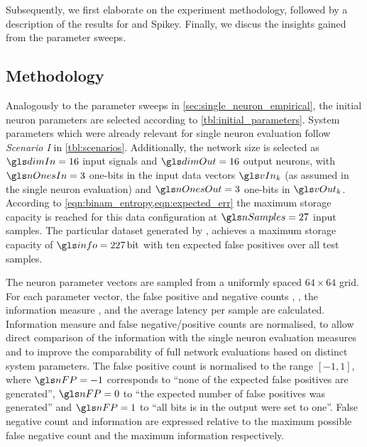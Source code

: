 Subsequently, we first elaborate on the experiment methodology, followed by a description of the results for \NMMC and Spikey. Finally, we discus the insights gained from the parameter sweeps.

\subsection{Methodology}
\label{sec:neuron_parameter_sweep_methodology}

Analogously to the parameter sweeps in \cref{sec:single_neuron_empirical}, the initial neuron parameters are selected according to \cref{tbl:initial_parameters}. System parameters which were already relevant for single neuron evaluation follow \emph{Scenario I} in \cref{tbl:scenarios}. Additionally, the network size is selected as $\dimIn = 16$ input signals and $\dimOut = 16$ output neurons, with $\nOnesIn = 3$ one-bits in the input data vectors $\vIn_k$ (as assumed in the single neuron evaluation) and $\nOnesOut = 3$ one-bits in $\vOut_k$.
According to \cref{eqn:binam_entropy,eqn:expected_err} the maximum storage capacity is reached for this data configuration at $\nSamples = 27$ input samples. The particular dataset \data generated by \PyNAM, achieves a maximum storage capacity of $\info = 227\,\mathrm{bit}$ with ten expected false positives over all test samples.

The neuron parameter vectors are sampled from a uniformly spaced $64 \times 64$ grid. For each parameter vector, the false positive and negative counts \nFP, \nFN, the information measure \info, and the average latency \latency per sample are calculated. Information measure and false negative/positive counts are normalised, to allow direct comparison of the information \info with the single neuron evaluation measures and to improve the comparability of full network evaluations based on distinct system parameters.
The false positive count \nFP is normalised to the range $[-1, 1]$, where $\nFP = -1$ corresponds to \enquote{none of the expected false positives are generated}, $\nFP = 0$ to \enquote{the expected number of false positives was generated} and $\nFP = 1$ to \enquote{all bits is in the output were set to one}.  False negative count and information are expressed relative to the maximum possible false negative count and the maximum information respectively.

